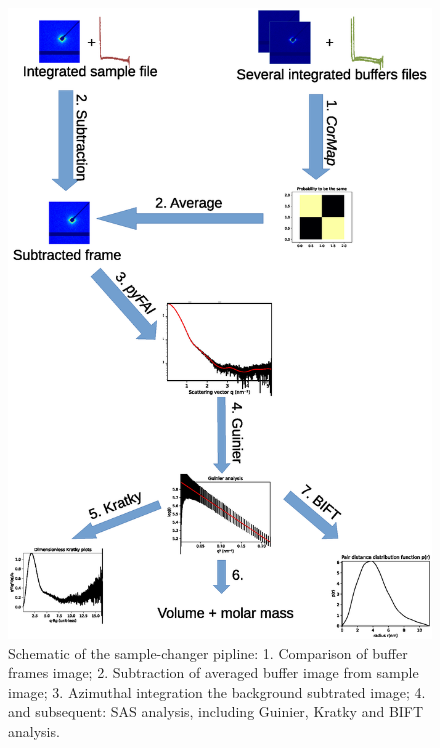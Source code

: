 \documentclass[preprint]{iucr}              %
\begin{document}
\begin{figure}
   \label{samplechanger_worflow}
   \includegraphics[width=12cm]{samplechanger_pipeline.eps}
   \caption{Schematic of the sample-changer pipline: 
   1. Comparison of buffer frames image;
   2. Subtraction of averaged buffer image from sample image;
   3. Azimuthal integration the background subtrated image;
   4. and subsequent: SAS analysis, including Guinier, Kratky and BIFT analysis.}
\end{figure}
\end{document}
